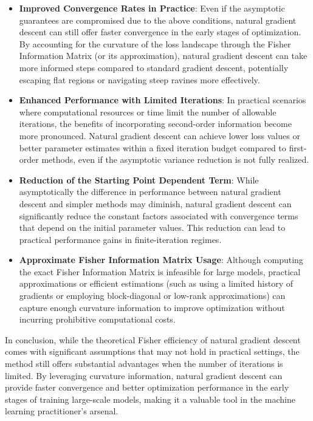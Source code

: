 \begin{itemize}
    \item \textbf{Improved Convergence Rates in Practice}: Even if the asymptotic guarantees are compromised due to the above conditions, natural gradient descent can still offer faster convergence in the early stages of optimization. By accounting for the curvature of the loss landscape through the Fisher Information Matrix (or its approximation), natural gradient descent can take more informed steps compared to standard gradient descent, potentially escaping flat regions or navigating steep ravines more effectively.

    \item \textbf{Enhanced Performance with Limited Iterations}: In practical scenarios where computational resources or time limit the number of allowable iterations, the benefits of incorporating second-order information become more pronounced. Natural gradient descent can achieve lower loss values or better parameter estimates within a fixed iteration budget compared to first-order methods, even if the asymptotic variance reduction is not fully realized.

    \item \textbf{Reduction of the Starting Point Dependent Term}: While asymptotically the difference in performance between natural gradient descent and simpler methods may diminish, natural gradient descent can significantly reduce the constant factors associated with convergence terms that depend on the initial parameter values. This reduction can lead to practical performance gains in finite-iteration regimes.

    \item \textbf{Approximate Fisher Information Matrix Usage}: Although computing the exact Fisher Information Matrix is infeasible for large models, practical approximations or efficient estimations (such as using a limited history of gradients or employing block-diagonal or low-rank approximations) can capture enough curvature information to improve optimization without incurring prohibitive computational costs.
\end{itemize}

In conclusion, while the theoretical Fisher efficiency of natural gradient descent comes with significant assumptions that may not hold in practical settings, the method still offers substantial advantages when the number of iterations is limited. By leveraging curvature information, natural gradient descent can provide faster convergence and better optimization performance in the early stages of training large-scale models, making it a valuable tool in the machine learning practitioner's arsenal.

